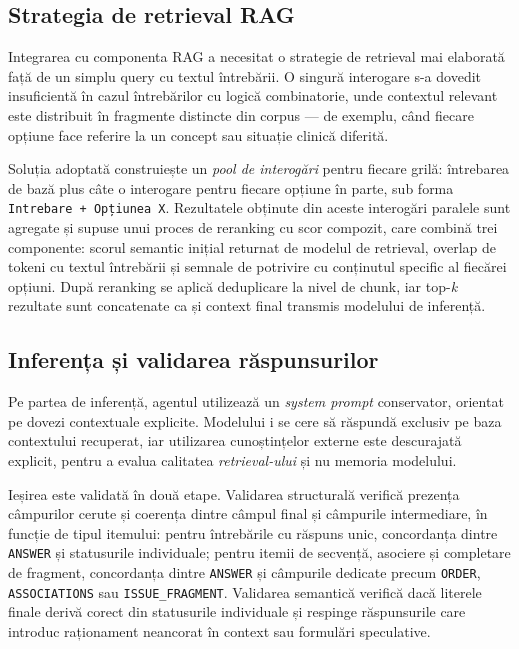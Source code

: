\documentclass[12pt, a4paper, oneside, romanian]{teza-upb}
\begin{document}
\subsection{Strategia de retrieval RAG}

Integrarea cu componenta RAG a necesitat o strategie de retrieval mai elaborată față de un simplu query cu textul întrebării. O singură interogare s-a dovedit insuficientă în cazul întrebărilor cu logică combinatorie, unde contextul relevant este distribuit în fragmente distincte din corpus --- de exemplu, când fiecare opțiune face referire la un concept sau situație clinică diferită.

Soluția adoptată construiește un \textit{pool de interogări} pentru fiecare grilă: întrebarea de bază plus câte o interogare pentru fiecare opțiune în parte, sub forma \texttt{Intrebare + Opțiunea X}. Rezultatele obținute din aceste interogări paralele sunt agregate și supuse unui proces de reranking cu scor compozit, care combină trei componente: scorul semantic inițial returnat de modelul de retrieval, overlap de tokeni cu textul întrebării și semnale de potrivire cu conținutul specific al fiecărei opțiuni. După reranking se aplică deduplicare la nivel de chunk, iar top-\textit{k} rezultate sunt concatenate ca și context final transmis modelului de inferență.

\subsection{Inferența și validarea răspunsurilor}

Pe partea de inferență, agentul utilizează un \textit{system prompt} conservator, orientat pe dovezi contextuale explicite. Modelului i se cere să răspundă exclusiv pe baza contextului recuperat, iar utilizarea cunoștințelor externe este descurajată explicit, pentru a evalua calitatea \textit{retrieval-ului} și nu memoria modelului.

Ieșirea este validată în două etape. Validarea structurală verifică prezența câmpurilor cerute și coerența dintre câmpul final și câmpurile intermediare, în funcție de tipul itemului: pentru întrebările cu răspuns unic, concordanța dintre \texttt{ANSWER} și statusurile individuale; pentru itemii de secvență, asociere și completare de fragment, concordanța dintre \texttt{ANSWER} și câmpurile dedicate precum \texttt{ORDER}, \texttt{ASSOCIATIONS} sau \texttt{ISSUE\_FRAGMENT}. Validarea semantică verifică dacă literele finale derivă corect din statusurile individuale și respinge răspunsurile care introduc raționament neancorat în context sau formulări speculative.
\end{document}
